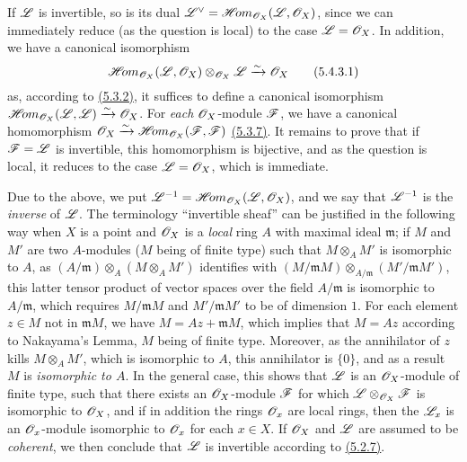 \begin{env}[5.4.3]
\label{env-0.5.4.3}
If $\mathscr{L}$ is invertible, so is its dual
${\mathscr{L}}^\vee=\mathscr{H}\!{om}_{\mathscr{O}_X}(\mathscr{L},\mathscr{O}_X)$, since we can immediately reduce
(as the question is local) to the case $\mathscr{L}=\mathscr{O}_X$. In addition, we have a
canonical isomorphism
\[
  \mathscr{H}\!{om}_{\mathscr{O}_X}(\mathscr{L},\mathscr{O}_X)\otimes_{\mathscr{O}_X}\mathscr{L}\xrightarrow{\sim}\mathscr{O}_X
  \tag{5.4.3.1}
\]
as, according to \hyperref[env-0.5.3.2]{(5.3.2)}, it suffices to define a canonical
isomorphism $\mathscr{H}\!{om}_{\mathscr{O}_X}(\mathscr{L},\mathscr{L})\xrightarrow{\sim}\mathscr{O}_X$. For {\em each}
$\mathscr{O}_X$-module $\mathscr{F}$, we have a canonical homomorphism
$\mathscr{O}_X\xrightarrow{\sim}\mathscr{H}\!{om}_{\mathscr{O}_X}(\mathscr{F},\mathscr{F})$ \hyperref[env-0.5.3.7]{(5.3.7)}. It remains to
prove that if $\mathscr{F}=\mathscr{L}$ is invertible, this homomorphism is bijective, and
as the question is local, it reduces to the case $\mathscr{L}=\mathscr{O}_X$, which is
immediate.

Due to the above, we put $\mathscr{L}^{-1}=\mathscr{H}\!{om}_{\mathscr{O}_X}(\mathscr{L},\mathscr{O}_X)$, and we say
that $\mathscr{L}^{-1}$ is the {\em inverse} of $\mathscr{L}$. The terminology
``invertible sheaf'' can be justified in the following way when $X$ is a point
and $\mathscr{O}_X$ is a {\em local} ring $A$ with maximal ideal
$\mathfrak{m}$; if $M$ and $M'$ are two $A$-modules ($M$ being of finite type)
such that $M\otimes_A M'$ is isomorphic to $A$, as
$(A/\mathfrak{m})\otimes_A(M\otimes_A M')$ identifies with
$(M/\mathfrak{m}M)\otimes_{A/\mathfrak{m}}(M'/\mathfrak{m}M')$, this latter
tensor product of vector spaces over the field $A/\mathfrak{m}$ is isomorphic to
$A/\mathfrak{m}$, which requires $M/\mathfrak{m}M$ and $M'/\mathfrak{m}M'$ to be
of dimension $1$. For each element $z\in M$ not in $\mathfrak{m}M$, we have
$M=Az+\mathfrak{m}M$, which implies that $M=Az$ according to Nakayama's Lemma,
$M$ being of finite type. Moreover, as the annihilator of $z$ kills
$M\otimes_A M'$, which is isomorphic to $A$, this annihilator is $\{0\}$, and
as a result $M$ is {\em isomorphic to $A$}. In the general case, this shows
that $\mathscr{L}$ is an $\mathscr{O}_X$-module of finite type, such that there exists an
$\mathscr{O}_X$-module $\mathscr{F}$ for which $\mathscr{L}\otimes_{\mathscr{O}_X}\mathscr{F}$ is isomorphic to
$\mathscr{O}_X$, and if in addition the rings $\mathscr{O}_x$ are local rings, then the
$\mathscr{L}_x$ is an $\mathscr{O}_x$-module isomorphic to $\mathscr{O}_x$ for each $x\in X$. If
$\mathscr{O}_X$ and $\mathscr{L}$ are assumed to be {\em coherent}, we then conclude that
$\mathscr{L}$ is invertible according to \hyperref[env-0.5.2.7]{(5.2.7)}.
\end{env}

